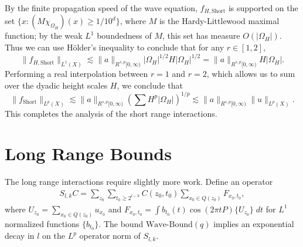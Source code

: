 %
By the finite propagation speed of the wave equation, $f_{H,\text{Short}}$ is supported on the set $\{ x: (M \chi_{\Omega_H})(x) \geq 1/10^d \}$, where $M$ is the Hardy-Littlewood maximal function; by the weak $L^1$ boundedness of $M$, this set has measure $O(|\Omega_H|)$. Thus we can use H\"{o}lder's inequality to conclude that for any $r \in [1,2]$,
%
\begin{equation}
    \| f_{H,\text{Short}} \|_{L^1(X)} \lesssim \| a \|_{R^{s,p}[0,\infty)} |\Omega_H|^{1/2} H |\Omega_H|^{1/2} = \| a \|_{R^{s,p}[0,\infty)} H |\Omega_H|.
\end{equation}
%
Performing a real interpolation between $r = 1$ and $r = 2$, which allows us to sum over the dyadic height scales $H$, we conclude that
%
\begin{equation}
    \| f_{\text{Short}} \|_{L^p(X)} \lesssim  \| a \|_{R^{s,p}[0,\infty)} \left( \sum H^p |\Omega_H| \right)^{1/p} \lesssim \| a \|_{R^{s,p}[0,\infty)} \| u \|_{L^p(X)}.
\end{equation}
%
This completes the analysis of the short range interactions.

\section{Long Range Bounds}

The long range interactions require slightly more work. Define an operator
%
\begin{equation}
\begin{split}
    S_{l,k} C = \sum\nolimits_{z_0} \sum\nolimits_{t_0 \geq 2^{l-k}} C(z_0,t_0) \sum\nolimits_{x_0 \in Q(z_0)} F_{x_0,t_0},
\end{split}
\end{equation}
%
where $U_{z_0} = \sum_{x_0 \in Q(z_0)} u_{x_0}$ and $F_{x_0,t_0} = \int b_{t_0}(t) \cos(2 \pi t P) \{ U_{z_0} \}\; dt$ for $L^1$ normalized functions $\{ b_{t_0} \}$. The bound $\text{Wave-Bound}(q)$ implies an exponential decay in $l$ on the $L^p$ operator norm of $S_{l,k}$.

